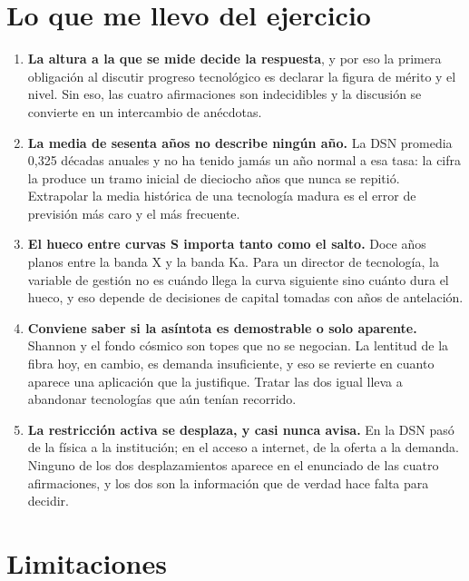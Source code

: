 \documentclass[11pt,letterpaper]{article}
\begin{document}
\section{Lo que me llevo del ejercicio}

\begin{enumerate}
\item \textbf{La altura a la que se mide decide la respuesta}, y por eso la
  primera obligación al discutir progreso tecnológico es declarar la figura de
  mérito y el nivel. Sin eso, las cuatro afirmaciones son indecidibles y la
  discusión se convierte en un intercambio de anécdotas.
\item \textbf{La media de sesenta años no describe ningún año.} La DSN
  promedia 0,325 décadas anuales y no ha tenido jamás un año normal a esa tasa:
  la cifra la produce un tramo inicial de dieciocho años que nunca se repitió.
  Extrapolar la media histórica de una tecnología madura es el error de
  previsión más caro y el más frecuente.
\item \textbf{El hueco entre curvas S importa tanto como el salto.} Doce años
  planos entre la banda X y la banda Ka. Para un director de tecnología, la
  variable de gestión no es cuándo llega la curva siguiente sino cuánto dura el
  hueco, y eso depende de decisiones de capital tomadas con años de antelación.
\item \textbf{Conviene saber si la asíntota es demostrable o solo aparente.}
  Shannon y el fondo cósmico son topes que no se negocian. La lentitud de la
  fibra hoy, en cambio, es demanda insuficiente, y eso se revierte en cuanto
  aparece una aplicación que la justifique. Tratar las dos igual lleva a
  abandonar tecnologías que aún tenían recorrido.
\item \textbf{La restricción activa se desplaza, y casi nunca avisa.} En la DSN
  pasó de la física a la institución; en el acceso a internet, de la oferta a
  la demanda. Ninguno de los dos desplazamientos aparece en el enunciado de las
  cuatro afirmaciones, y los dos son la información que de verdad hace falta
  para decidir.
\end{enumerate}

\section{Limitaciones}
\end{document}
